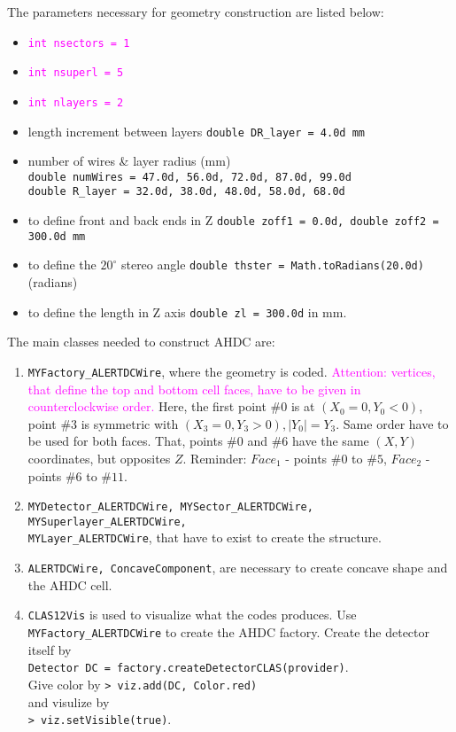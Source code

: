 The parameters necessary for geometry construction are listed below:
\begin{itemize}
		\item {\textcolor{magenta}{\texttt{int nsectors = 1}}}
		\item {\textcolor{magenta}{\texttt{int nsuperl = 5}}}
		\item {\textcolor{magenta}{\texttt{int nlayers = 2}}}
		\item length increment between layers \texttt{double DR\_layer  = 4.0d mm} 
		\item {number of wires \& layer radius (mm) \\					\texttt{double numWires    = 47.0d, 56.0d, 72.0d, 87.0d, 99.0d} \\
       			\texttt{double R\_layer  = 32.0d, 38.0d, 48.0d, 58.0d, 68.0d}} 
		\item {to define front and back ends in Z \texttt{double zoff1 = 0.0d, 
        double zoff2 = 300.0d mm}}
		\item to define the $20^{\circ}$ stereo angle \texttt{double thster = Math.toRadians(20.0d)} (radians)
		\item to define the length in Z axis \texttt{double zl = 300.0d} in mm.
	\end{itemize}

\newpage
The main classes needed to construct AHDC are:
\begin{enumerate}
	\item \texttt{MYFactory\_ALERTDCWire}, where the geometry is coded. \textcolor{magenta}{Attention: vertices, that define the top and bottom cell faces, have to be given in counterclockwise order.} Here, the first point $\#0$ is at $(X_0=0, Y_0<0)$, point $\#3$ is symmetric with $(X_3 = 0, Y_3 > 0), |{Y_0}| = Y_3$. Same order have to be used for both faces. That, points $\#0$ and $\#6$ have the same $(X,Y)$ coordinates, but opposites $Z$. Reminder: $Face_1$ - points $\#0$ to $\#5$, $Face_2$ - points $\#6$ to $\#11$.
	\item \texttt{MYDetector\_ALERTDCWire, MYSector\_ALERTDCWire, MYSuperlayer\_ALERTDCWire, \\ MYLayer\_ALERTDCWire}, that have to exist to create the structure.
	\item \texttt{ALERTDCWire, ConcaveComponent}, are necessary to create concave shape and the AHDC cell.
	\item \texttt{CLAS12Vis} is used to visualize what the codes produces. Use \texttt{MYFactory\_ALERTDCWire} to create the AHDC factory. Create the detector itself by \\ \texttt{Detector DC = factory.createDetectorCLAS(provider)}. \\ Give color by  \texttt{> viz.add(DC, Color.red)} \\ and visulize by \\ \texttt{> viz.setVisible(true)}.
\end{enumerate}

